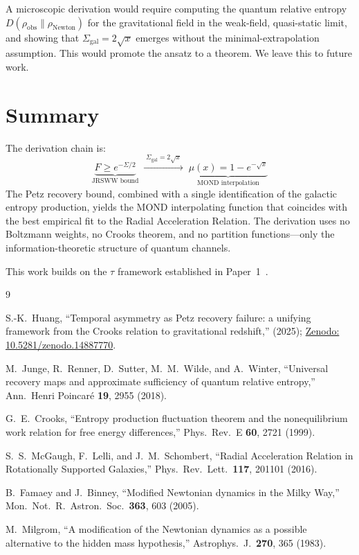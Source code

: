 \documentclass[prd,twocolumn,superscriptaddress,longbibliography,floatfix]{revtex4-2}
\newcommand{\tauasym}{\tau}
\begin{document}
A microscopic derivation would require computing the quantum
relative entropy $D(\rho_{\mathrm{obs}}\|\rho_{\mathrm{Newton}})$
for the gravitational field in the weak-field, quasi-static limit,
and showing that $\Sigma_{\mathrm{gal}} = 2\sqrt{x}$ emerges
without the minimal-extrapolation assumption. This would promote
the ansatz to a theorem. We leave this to future work.

\section{Summary}
\label{sec:summary}

The derivation chain is:
\begin{equation}
  \underbrace{F \geq e^{-\Sigma/2}}_{\text{JRSWW bound}}
  \;\xrightarrow{\;\Sigma_{\mathrm{gal}} = 2\sqrt{x}\;}\;
  \underbrace{\mu(x) = 1 - e^{-\sqrt{x}}}_{\text{MOND interpolation}}
  \label{eq:chain}
\end{equation}
The Petz recovery bound, combined with a single identification of
the galactic entropy production, yields the MOND interpolating
function that coincides with the best empirical fit to the Radial
Acceleration Relation. The derivation uses no Boltzmann weights, no
Crooks theorem, and no partition functions---only the
information-theoretic structure of quantum channels.

\begin{acknowledgments}
This work builds on the $\tauasym$ framework established in
Paper~1~\cite{Huang2025paper1}.
\end{acknowledgments}

\begin{thebibliography}{9}

S.-K.~Huang,
``Temporal asymmetry as Petz recovery failure: a unifying
framework from the Crooks relation to gravitational redshift,''
(2025); \href{https://doi.org/10.5281/zenodo.14887770}
{Zenodo: 10.5281/zenodo.14887770}.

M.~Junge, R.~Renner, D.~Sutter, M.~M.~Wilde, and A.~Winter,
``Universal recovery maps and approximate sufficiency of quantum
relative entropy,''
Ann.\ Henri Poincar\'{e} \textbf{19}, 2955 (2018).

G.~E.~Crooks,
``Entropy production fluctuation theorem and the
nonequilibrium work relation for free energy differences,''
Phys.\ Rev.\ E \textbf{60}, 2721 (1999).

S.~S.~McGaugh, F.~Lelli, and J.~M.~Schombert,
``Radial Acceleration Relation in Rotationally Supported
Galaxies,''
Phys.\ Rev.\ Lett.\ \textbf{117}, 201101 (2016).

B.~Famaey and J.~Binney,
``Modified Newtonian dynamics in the Milky Way,''
Mon.\ Not.\ R.\ Astron.\ Soc.\ \textbf{363}, 603 (2005).

M.~Milgrom,
``A modification of the Newtonian dynamics as a possible
alternative to the hidden mass hypothesis,''
Astrophys.\ J.\ \textbf{270}, 365 (1983).

\end{thebibliography}
\end{document}
